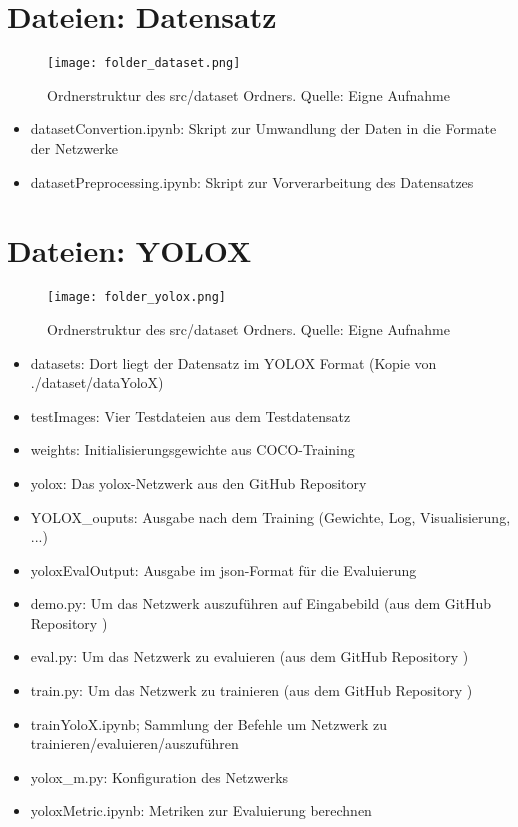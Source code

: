 \section{Dateien: Datensatz}
\begin{figure}[h]
	\centering
	\texttt{[image: folder\_dataset.png]}
	\caption[Ordnerstruktur des src/dataset Ordners.]{Ordnerstruktur des src/dataset Ordners. Quelle: Eigne Aufnahme}
\end{figure}

\begin{itemize}
	\item datasetConvertion.ipynb: Skript zur Umwandlung der Daten in die Formate der Netzwerke
	\item datasetPreprocessing.ipynb: Skript zur Vorverarbeitung des Datensatzes
\end{itemize}



\section{Dateien: YOLOX}
\begin{figure}[h]
	\centering
	\texttt{[image: folder\_yolox.png]}
	\caption[Ordnerstruktur des src/dataset Ordners.]{Ordnerstruktur des src/dataset Ordners. Quelle: Eigne Aufnahme}
\end{figure}

\begin{itemize}
	\item datasets: Dort liegt der Datensatz im YOLOX Format (Kopie von ./dataset/dataYoloX)
	\item testImages: Vier Testdateien aus dem Testdatensatz
	\item weights: Initialisierungsgewichte aus COCO-Training
	\item yolox: Das yolox-Netzwerk aus den GitHub Repository \cite{yoloxGitHubRepo}
	\item YOLOX\_ouputs: Ausgabe nach dem Training (Gewichte, Log, Visualisierung, ...)
	\item yoloxEvalOutput: Ausgabe im json-Format für die Evaluierung
	\item demo.py: Um das Netzwerk auszuführen auf Eingabebild (aus dem GitHub Repository \cite{yoloxGitHubRepo})
	\item eval.py: Um das Netzwerk zu evaluieren (aus dem GitHub Repository \cite{yoloxGitHubRepo})
	\item train.py: Um das Netzwerk zu trainieren (aus dem GitHub Repository \cite{yoloxGitHubRepo})
	\item trainYoloX.ipynb; Sammlung der Befehle um Netzwerk zu trainieren/evaluieren/auszuführen
	\item yolox\_m.py: Konfiguration des Netzwerks
	\item yoloxMetric.ipynb: Metriken zur Evaluierung berechnen
\end{itemize}

